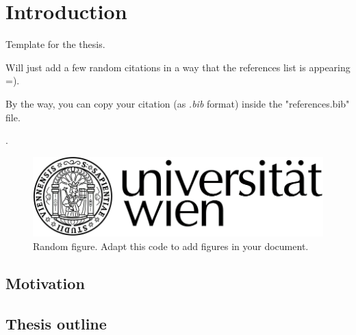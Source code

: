 \chapter{Introduction} 

Template for the thesis. \par
Will just add a few random citations in a way that the references list is appearing =). \par
By the way, you can copy your citation (as \textit{.bib} format) inside the "references.bib" file. \par

\citet{Petley2012Global,Crozier2005Landslide,Guzzetti1999Landslide,Guzzetti2005Landslide,Soeters1996Slope,Cascini2005Landslide,Rossi2013,VanWesten2008Spatial,Cruden1996Landslide}. 



\begin{figure}[!h]
\setcapindent{0em}
    \centering
    \includegraphics[width=\textwidth]{figures/logo.png}
    \caption[Random figure.]{Random figure. Adapt this code to add figures in your document.}
    \label{fig:random_fig}
\end{figure}

{\textcolor{red}{\lipsum[1-2]}}

\section{Motivation}
{\textcolor{red}{ \lipsum[1-2]}}

\section{Thesis outline}
{\textcolor{red}{ \lipsum[1]}}